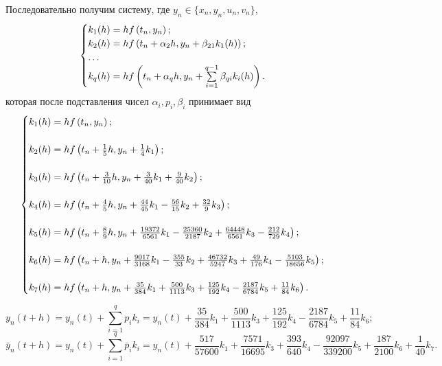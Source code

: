 \documentclass[a4paper,14pt]{article}
\begin{document}
Последовательно получим систему, где $y_n \in \{x_n, y_n, u_n, v_n\}$,
\[
	\begin{cases}
k_1(h) = h f \left(t_n, y_n\right);\\
k_2(h) = h f \left(t_n + \alpha_2 h,y_n+\beta_{21}k_1(h)\right);\\
\dots\\ 
k_q(h) = h f \left(t_n + \alpha_q h,y_n+ \sum\limits_{i=1}^{q-1} \beta_{qi}k_i(h)\right).\\
	\end{cases}\\
\]
которая после подставления чисел $\alpha_i,  p_i, \beta_i$ принимает вид
\[
\begin{cases}
k_1(h) = h f \left(t_n,y_n \right);\\
\\
k_2(h) = h f \left(t_n + \frac{1}{5}h,y_n+\frac{1}{4} k_1\right);\\
\\
k_3(h) = h f \left(t_n + \frac{3}{10}h,y_n+\frac{3}{40}k_1 + \frac{9}{40}k_2\right);\\
\\
k_4(h) = h f \left(t_n + \frac{4}{5}h, y_n + \frac{44}{45}k_1 - \frac{56}{15} k_2 + \frac{32}{9} k_3\right);\\
\\
k_5(h) = h f \left(t_n + \frac{8}{9}h,y_n+\frac{19372}{6561}k_1 - \frac{25360}{2187} k_2 +\frac{64448}{6561} k_3 - \frac{212}{729} k_4\right);\\
\\
k_6(h) = h f \left(t_n + h,y_n + \frac{9017}{3168}k_1 - \frac{355}{33}k_2  + \frac{46732}{5247} k_3 + \frac{49}{176} k_4 - \frac{5103}{18656} k_5 \right);\\
\\
k_7(h) = h f \left(t_n + h,y_n + \frac{35}{384}k_1 + \frac{500}{1113} k_3 + \frac{125}{192} k_4 - \frac{2187}{6784} k_5 + \frac{11}{84} k_6 \right).\\

\end{cases}\\
\]

\[
y_{n}(t+h) = y_n (t) + \sum_{i=1}^q {p_ik_i} = y_n (t) + \frac{35}{384}k_1 + \frac{500}{1113} k_3 + \frac{125}{192} k_4 - \frac{2187}{6784} k_5 + \frac{11}{84} k_6;
\]
\[
\bar {y}_{n}(t+h) = y_n (t) + \sum_{i=1}^q {\bar p_ik_i} = y_n (t) + \frac{517}{57600}k_1 + \frac{7571}{16695}k_3 +\frac{393}{640}k_4 - \frac{92097}{339200}k_5 + \frac{187}{2100}k_6 + \frac{1}{40}k_7. 
\]
\end{document}
